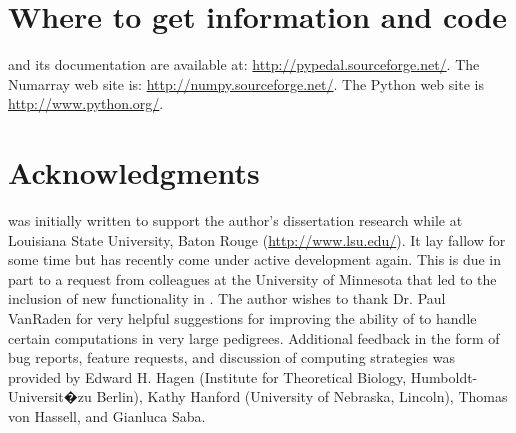 \section{Where to get information and code}
\PYPEDAL{} and its documentation are available at: \url{http://pypedal.sourceforge.net/}. The Numarray web site is: \url{http://numpy.sourceforge.net/}. The Python web site is \url{http://www.python.org/}.

\section{Acknowledgments}
\PYPEDAL{} was initially written to support the author's dissertation research while at Louisiana State University, Baton Rouge (\url{http://www.lsu.edu/}).  It lay fallow for some time but has recently come under active development again.  This is due in part to a request from colleagues at the University of Minnesota that led to the inclusion of new functionality in \PYPEDAL{}.  The author wishes to thank Dr. Paul Van{R}aden for very helpful suggestions for improving the ability of \PYPEDAL{} to handle certain computations in very large pedigrees.  Additional feedback in the form of bug reports, feature requests, and discussion of computing strategies was provided by Edward H. Hagen (Institute for Theoretical Biology, Humboldt-Universit�zu Berlin), Kathy Hanford (University of Nebraska, Lincoln), Thomas von Hassell, and Gianluca Saba.
